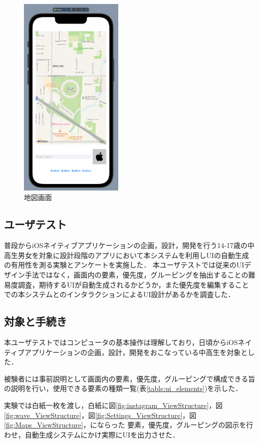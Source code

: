 \begin{figure}[htbp]
  \begin{minipage}{\hsize}
    \begin{center}
       \includegraphics[width=50mm]{img/Maps_autogen.png}
    \end{center}
    \caption{地図画面}
    \label{fig:Maps_autogen}
  \end{minipage}
\end{figure}


\subsection{ユーザテスト}
普段からiOSネイティブアプリケーションの企画，設計，開発を行う14-17歳の中高生男女を対象に設計段階のアプリにおいて本システムを利用しUIの自動生成の有用性を測る実験とアンケートを実施した．
本ユーザテストでは従来のUIデザイン手法ではなく，画面内の要素，優先度，グルーピングを抽出することの難易度調査，期待するUIが自動生成されるかどうか，また優先度を編集することでの本システムとのインタラクションによるUI設計があるかを調査した．
\subsection{対象と手続き}
本ユーザテストではコンピュータの基本操作は理解しており，日頃からiOSネイティブアプリケーションの企画，設計，開発をおこなっている中高生を対象とした．

被験者には事前説明として画面内の要素，優先度，グルーピングで構成できる旨の説明を行い，使用できる要素の種類一覧(表\ref{table:ui_elements})を示した．

実験では白紙一枚を渡し，白紙に図\ref{fig:instagram_ViewStructure}，図\ref{fig:wave_ViewStructure}，図\ref{fig:Settings_ViewStructure}，図\ref{fig:Maps_ViewStructure}，にならった 要素，優先度，グルーピングの図示を行わせ，自動生成システムにかけ実際にUIを出力させた．


